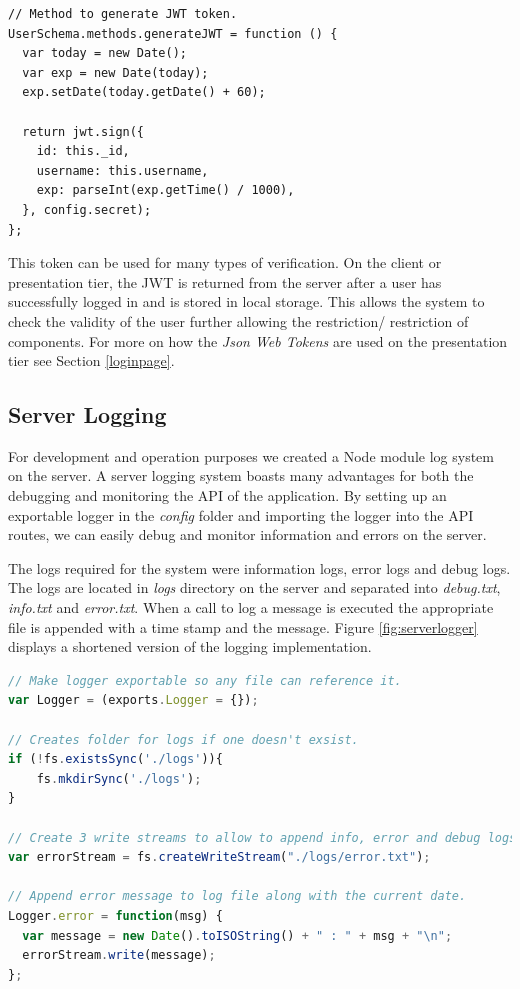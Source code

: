 \begin{lstlisting}[language=JAVASCRIPTcaption={Creating a JSON Web Token},captionpos=b,label={fig:jwttoken}]
// Method to generate JWT token.
UserSchema.methods.generateJWT = function () {
  var today = new Date();
  var exp = new Date(today);
  exp.setDate(today.getDate() + 60);

  return jwt.sign({
    id: this._id,
    username: this.username,
    exp: parseInt(exp.getTime() / 1000),
  }, config.secret);
};
\end{lstlisting}

This token can be used for many types of verification. On the client or presentation tier, the JWT is returned from the server after a user has successfully logged in and is stored in local storage. This allows the system to check the validity of the user further allowing the restriction/ restriction of components. For more on how the \textit{Json Web Tokens} are used on the presentation tier see Section \ref{loginpage}.

\subsection{Server Logging}
For development and operation purposes we created a Node module log system on the server. A server logging system boasts many advantages for both the debugging and monitoring the API of the application. By setting up an exportable logger in the \textit{config} folder and importing the logger into the API routes, we can easily debug and monitor information and errors on the server.

The logs required for the system were information logs, error logs and debug logs. The logs are located in \textit{logs} directory on the server and separated into \textit{debug.txt}, \textit{info.txt} and \textit{error.txt}. When a call to log a message is executed the appropriate file is appended with a time stamp and the message. Figure \ref{fig:serverlogger} displays a shortened version of the logging implementation.

\begin{lstlisting}[language=JAVASCRIPT,caption={Server Logging},captionpos=b,label={fig:serverlogger}]
// Make logger exportable so any file can reference it.
var Logger = (exports.Logger = {});

// Creates folder for logs if one doesn't exsist.
if (!fs.existsSync('./logs')){
    fs.mkdirSync('./logs');
}

// Create 3 write streams to allow to append info, error and debug logs to different streams.
var errorStream = fs.createWriteStream("./logs/error.txt");

// Append error message to log file along with the current date.
Logger.error = function(msg) {
  var message = new Date().toISOString() + " : " + msg + "\n";
  errorStream.write(message);
};
\end{lstlisting}

